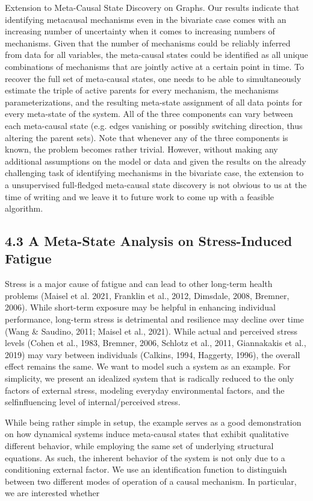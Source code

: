 \documentclass[10pt]{article}
\begin{document}
Extension to Meta-Causal State Discovery on Graphs. Our results indicate that identifying metacausal mechanisms even in the bivariate case comes with an increasing number of uncertainty when it comes to increasing numbers of mechanisms. Given that the number of mechanisms could be reliably inferred from data for all variables, the meta-causal states could be identified as all unique combinations of mechanisms that are jointly active at a certain point in time. To recover the full set of meta-causal states, one needs to be able to simultaneously estimate the triple of active parents for every mechanism, the mechanisms parameterizations, and the resulting meta-state assignment of all data points for every meta-state of the system. All of the three components can vary between each meta-causal state (e.g. edges vanishing or possibly switching direction, thus altering the parent sets). Note that whenever any of the three components is known, the problem becomes rather trivial. However, without making any additional assumptions on the model or data and given the results on the already challenging task of identifying mechanisms in the bivariate case, the extension to a unsupervised full-fledged meta-causal state discovery is not obvious to us at the time of writing and we leave it to future work to come up with a feasible algorithm.

\subsection*{4.3 A Meta-State Analysis on Stress-Induced Fatigue}
Stress is a major cause of fatigue and can lead to other long-term health problems (Maisel et al. 2021, Franklin et al., 2012, Dimsdale, 2008, Bremner, 2006). While short-term exposure may be helpful in enhancing individual performance, long-term stress is detrimental and resilience may decline over time (Wang \& Saudino, 2011; Maisel et al., 2021). While actual and perceived stress levels (Cohen et al., 1983, Bremner, 2006, Schlotz et al., 2011, Giannakakis et al., 2019) may vary between individuals (Calkins, 1994, Haggerty, 1996), the overall effect remains the same. We want to model such a system as an example. For simplicity, we present an idealized system that is radically reduced to the only factors of external stress, modeling everyday environmental factors, and the selfinfluencing level of internal/perceived stress.

While being rather simple in setup, the example serves as a good demonstration on how dynamical systems induce meta-causal states that exhibit qualitative different behavior, while employing the same set of underlying structural equations. As such, the inherent behavior of the system is not only due to a conditioning external factor. We use an identification function to distinguish between two different modes of operation of a causal mechanism. In particular, we are interested whether
\end{document}
